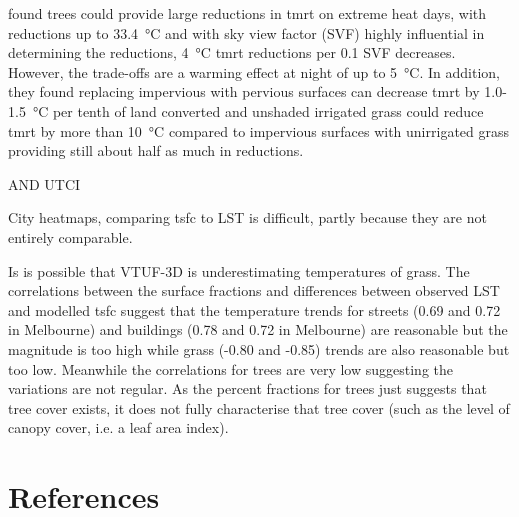 \documentclass[final,3p,times,authoryear]{elsarticle}
\begin{document}
\cite{Middel2019a} found trees could provide large reductions in \gls{tmrt} on extreme heat days, with reductions up to 33.4\SI{}{\degreeCelsius} and with sky view factor (SVF) highly influential in determining the reductions, 4\SI{}{\degreeCelsius} \gls{tmrt} reductions per 0.1 SVF decreases. However, the trade-offs are a warming effect at night of up to 5\SI{}{\degreeCelsius}. In addition, they found replacing impervious with pervious surfaces can decrease \gls{tmrt} by 1.0-1.5\SI{}{\degreeCelsius} per tenth of land converted and unshaded irrigated grass could reduce \gls{tmrt} by more than 10\SI{}{\degreeCelsius} compared to impervious surfaces with unirrigated grass providing still about half as much in reductions.




AND UTCI





City heatmaps, comparing \gls{tsfc} to LST is difficult, partly because they are not entirely comparable. 

Is is possible that VTUF-3D is underestimating temperatures of grass. The correlations between the surface fractions and differences between observed LST and modelled \gls{tsfc} suggest that the temperature trends for streets (0.69 and 0.72 in Melbourne) and buildings (0.78 and 0.72 in Melbourne) are reasonable but the magnitude is too high while grass (-0.80 and -0.85) trends are also reasonable but too low. Meanwhile the correlations for trees are very low suggesting the variations are not regular. As the percent fractions for trees just suggests that tree cover exists, it does not fully characterise that tree cover (such as the level of canopy cover, i.e. a leaf area index). 



\printglossaries

\section*{References}\label{sec:ref}
\end{document}
